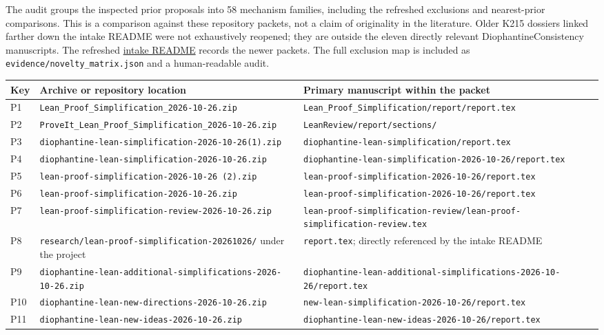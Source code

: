 \documentclass[11pt]{article}
\theoremstyle{remark}\newtheorem{remark}[proposition]{Remark}
\newcommand{\code}[1]{\nolinkurl{#1}}
\begin{document}
The audit groups the inspected prior proposals into 58 mechanism families, including the refreshed exclusions and nearest-prior comparisons. This is a comparison against these repository packets, not a claim of originality in the literature. Older K215 dossiers linked farther down the intake README were not exhaustively reopened; they are outside the eleven directly relevant DiophantineConsistency manuscripts. The refreshed \href{https://github.com/VladimirReshetnikov/ProveIt/blob/6f46a5e3480a2fa2e45993b8090826f256aeaa56/docs/incoming/README.md}{intake README} records the newer packets. The full exclusion map is included as \code{evidence/novelty_matrix.json} and a human-readable audit.

\begin{longtable}{P{.06\textwidth}P{.45\textwidth}P{.39\textwidth}}
\toprule
Key & Archive or repository location & Primary manuscript within the packet\\\midrule\endhead
P1 & \code{Lean_Proof_Simplification_2026-10-26.zip} & \code{Lean_Proof_Simplification/report/report.tex}\\
P2 & \code{ProveIt_Lean_Proof_Simplification_2026-10-26.zip} & \code{LeanReview/report/sections/}\\
P3 & \code{diophantine-lean-simplification-2026-10-26(1).zip} & \code{diophantine-lean-simplification/report.tex}\\
P4 & \code{diophantine-lean-simplification-2026-10-26.zip} & \code{diophantine-lean-simplification-2026-10-26/report.tex}\\
P5 & \code{lean-proof-simplification-2026-10-26 (2).zip} & \code{lean-proof-simplification-2026-10-26/report.tex}\\
P6 & \code{lean-proof-simplification-2026-10-26.zip} & \code{lean-proof-simplification-2026-10-26/report.tex}\\
P7 & \code{lean-proof-simplification-review-2026-10-26.zip} & \code{lean-proof-simplification-review/lean-proof-simplification-review.tex}\\
P8 & \code{research/lean-proof-simplification-20261026/} under the project & \code{report.tex}; directly referenced by the intake README\\
P9 & \code{diophantine-lean-additional-simplifications-2026-10-26.zip} & \code{diophantine-lean-additional-simplifications-2026-10-26/report.tex}\\
P10 & \code{diophantine-lean-new-directions-2026-10-26.zip} & \code{new-lean-simplification-2026-10-26/report.tex}\\
P11 & \code{diophantine-lean-new-ideas-2026-10-26.zip} & \code{diophantine-lean-new-ideas-2026-10-26/report.tex}\\
\bottomrule
\end{longtable}
\end{document}
